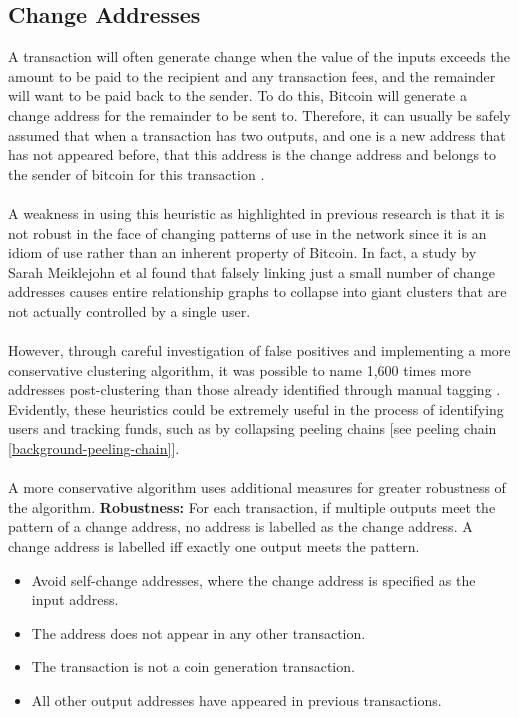 \subsection{Change Addresses}\label{background:cluster-change-address}
A transaction will often generate change when the value of the inputs exceeds the amount to be paid to the recipient and any transaction fees, and the remainder will want to be paid back to the sender. To do this, Bitcoin will generate a change address for the remainder to be sent to. Therefore, it can usually be safely assumed that when a transaction has two outputs, and one is a new address that has not appeared before, that this address is the change address and belongs to the sender of bitcoin for this transaction \cite{RefWorks:doc:5c3de14be4b042abd3bcc2c6}. 
\\\\
A weakness in using this heuristic as highlighted in previous research \cite{Refworks:doc:5c3de7e3e4b0ea6196452d80} is that it is not robust in the face of changing patterns of use in the network since it is an idiom of use rather than an inherent property of Bitcoin. In fact, a study by Sarah Meiklejohn et al \cite{Refworks:doc:5c3de7e3e4b0ea6196452d80} found that falsely linking just a small number of change addresses causes entire relationship graphs to collapse into giant clusters that are not actually controlled by a single user. 
\\\\
However, through careful investigation of false positives and implementing a more conservative clustering algorithm, it was possible to name 1,600 times more addresses post-clustering than those already identified through manual tagging \cite{Refworks:doc:5c3de7e3e4b0ea6196452d80}. Evidently, these heuristics could be extremely useful in the process of identifying users and tracking funds, such as by collapsing peeling chains [see peeling chain \ref{background-peeling-chain}].
\\\\
A more conservative algorithm uses additional measures for greater robustness of the algorithm. 
\textbf{Robustness:} 
For each transaction, if multiple outputs meet the pattern of a change address, no address is labelled as the change address. A change address is labelled iff exactly one output meets the pattern. 
\begin{itemize}
    \item Avoid self-change addresses, where the change address is specified as the input address. 
    \item The address does not appear in any other transaction.
    \item The transaction is not a coin generation transaction. 
    \item All other output addresses have appeared in previous transactions.
\end{itemize}


